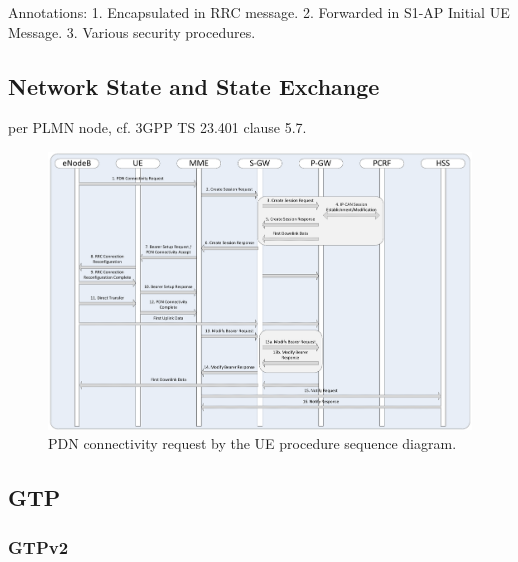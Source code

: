 Annotations:
1. Encapsulated in RRC message.
2. Forwarded in S1-AP Initial UE Message.
3. Various security procedures.



\subsection{Network State and State Exchange}
per PLMN node, cf. 3GPP TS 23.401 clause 5.7.

\begin{figure}[htbp]
	\centering
	\includegraphics[width=1.2\textwidth]{images/UE-requested-PDN-connectivity.pdf}
	\caption{PDN connectivity request by the UE procedure sequence diagram.}
	\label{c4:fig:3gpp-uepdnreq}
\end{figure}



\subsection{\ac{GTP}}

\subsubsection{GTPv2}


